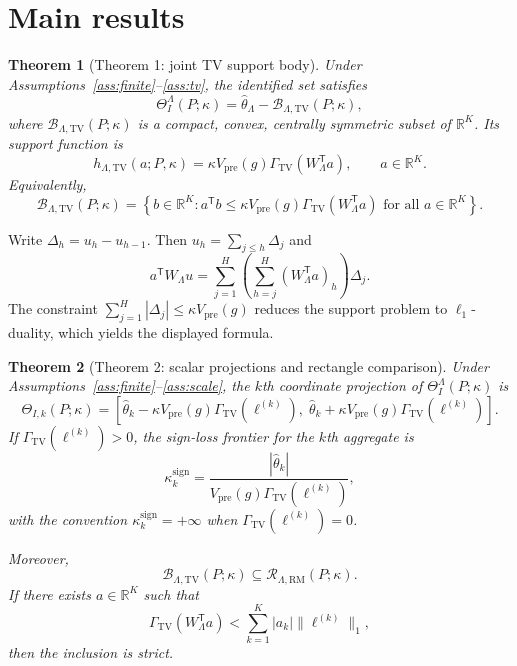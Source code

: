 \documentclass[11pt]{article}
\newcommand{\transpose}{\mathsf{T}}
\newcommand{\R}{\mathbb{R}}
\theoremstyle{definition}
\theoremstyle{plain}
\newtheorem{theorem}{Theorem}
\theoremstyle{remark}
\begin{document}
\section{Main results}
\begin{theorem}[Theorem 1: joint TV support body]\label{thm:joint-body}
Under Assumptions~\ref{ass:finite}--\ref{ass:tv}, the identified set satisfies
\[
\Theta_I^\Lambda(P;\kappa)=\hat\theta_\Lambda-\mathcal B_{\Lambda,\mathrm{TV}}(P;\kappa),
\]
where \(\mathcal B_{\Lambda,\mathrm{TV}}(P;\kappa)\) is a compact, convex, centrally symmetric subset of \(\R^K\). Its support function is
\[
h_{\Lambda,\mathrm{TV}}(a;P,\kappa)
=
\kappa V_{\mathrm{pre}}(g)\Gamma_{\mathrm{TV}}(W_\Lambda^\transpose a),
\qquad a\in\R^K.
\]
Equivalently,
\[
\mathcal B_{\Lambda,\mathrm{TV}}(P;\kappa)
=
\left\{
b\in\R^K:
a^\transpose b
\le
\kappa V_{\mathrm{pre}}(g)\Gamma_{\mathrm{TV}}(W_\Lambda^\transpose a)
\text{ for all }a\in\R^K
\right\}.
\]
\end{theorem}

Write \(\Delta_h=u_h-u_{h-1}\). Then \(u_h=\sum_{j\le h}\Delta_j\) and
\[
a^\transpose W_\Lambda u
=
\sum_{j=1}^H
\left(
\sum_{h=j}^H (W_\Lambda^\transpose a)_h
\right)\Delta_j.
\]
The constraint \(\sum_{j=1}^H |\Delta_j|\le \kappa V_{\mathrm{pre}}(g)\) reduces the support problem to \(\ell_1\)-duality, which yields the displayed formula.

\begin{theorem}[Theorem 2: scalar projections and rectangle comparison]\label{thm:projection-rectangle}
Under Assumptions~\ref{ass:finite}--\ref{ass:scale}, the \(k\)th coordinate projection of \(\Theta_I^\Lambda(P;\kappa)\) is
\[
\Theta_{I,k}(P;\kappa)
=
\left[
\hat\theta_k-\kappa V_{\mathrm{pre}}(g)\Gamma_{\mathrm{TV}}(\ell^{(k)}),\;
\hat\theta_k+\kappa V_{\mathrm{pre}}(g)\Gamma_{\mathrm{TV}}(\ell^{(k)})
\right].
\]
If \(\Gamma_{\mathrm{TV}}(\ell^{(k)})>0\), the sign-loss frontier for the \(k\)th aggregate is
\[
\kappa^{\mathrm{sign}}_k
=
\frac{|\hat\theta_k|}{V_{\mathrm{pre}}(g)\Gamma_{\mathrm{TV}}(\ell^{(k)})},
\]
with the convention \(\kappa^{\mathrm{sign}}_k=+\infty\) when \(\Gamma_{\mathrm{TV}}(\ell^{(k)})=0\).

Moreover,
\[
\mathcal B_{\Lambda,\mathrm{TV}}(P;\kappa)\subseteq \mathcal R_{\Lambda,\mathrm{RM}}(P;\kappa).
\]
If there exists \(a\in\R^K\) such that
\[
\Gamma_{\mathrm{TV}}(W_\Lambda^\transpose a)
<
\sum_{k=1}^K |a_k|\|\ell^{(k)}\|_1,
\]
then the inclusion is strict.
\end{theorem}
\end{document}
